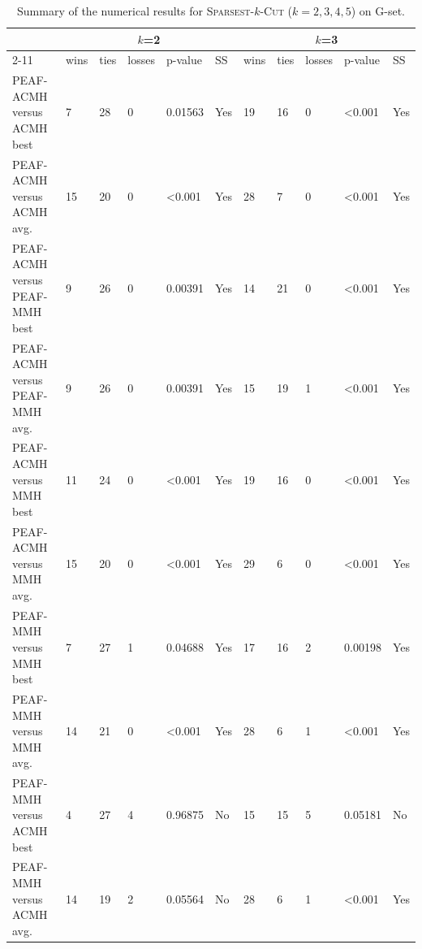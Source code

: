 \documentclass[12pt, a4paper]{article}%
\renewcommand{\arraystretch}{1.3}
\numberwithin{equation}{section}
\theoremstyle{plain}
\begin{document}
			{
				\scriptsize
				\setlength{\tabcolsep}{10pt}
				\renewcommand{\arraystretch}{1.6}
				\begin{landscape}
					\begin{longtable}{|l|lllll|lllll|}
						\caption[Summary for \textsc{Sparsest}-$k$-\textsc{Cut}]{Summary of the numerical results for \textsc{Sparsest}-$k$-\textsc{Cut} ($k=2,3,4,5$) on G-set.}
						\label{tab::sparsest-summary}\\
						\hline
						\multicolumn{1}{|c|}{\multirow{2}{*}{}} & \multicolumn{5}{c|}{$k$=2}                    & \multicolumn{5}{c|}{$k$=3}                    \\ \cline{2-11} 
						\multicolumn{1}{|c|}{}                  & wins & ties & losses & p-value          & SS  & wins & ties & losses & p-value          & SS  \\ \hline
						PEAF-ACMH versus ACMH best             & 7    & 28   & 0      & 0.01563          & Yes & 19   & 16   & 0      & \textless{}0.001 & Yes \\
						PEAF-ACMH versus ACMH avg.             & 15   & 20   & 0      & \textless{}0.001 & Yes & 28   & 7    & 0      & \textless{}0.001 & Yes \\
						PEAF-ACMH versus PEAF-MMH best           & 9    & 26   & 0      & 0.00391          & Yes & 14   & 21   & 0      & \textless{}0.001 & Yes \\
						PEAF-ACMH versus PEAF-MMH avg.           & 9    & 26   & 0      & 0.00391          & Yes & 15   & 19   & 1      & \textless{}0.001 & Yes \\
						PEAF-ACMH versus MMH best               & 11   & 24   & 0      & \textless{}0.001 & Yes & 19   & 16   & 0      & \textless{}0.001 & Yes \\
						PEAF-ACMH versus MMH avg.               & 15   & 20   & 0      & \textless{}0.001 & Yes & 29   & 6    & 0      & \textless{}0.001 & Yes \\
						PEAF-MMH versus MMH best                 & 7    & 27   & 1      & 0.04688          & Yes & 17   & 16   & 2      & 0.00198          & Yes \\
						PEAF-MMH versus MMH avg.                 & 14   & 21   & 0      & \textless{}0.001 & Yes & 28   & 6    & 1      & \textless{}0.001 & Yes \\
						PEAF-MMH versus ACMH best               & 4    & 27   & 4      & 0.96875          & No  & 15   & 15   & 5      & 0.05181          & No  \\
						PEAF-MMH versus ACMH avg.               & 14   & 19   & 2      & 0.05564          & No  & 28   & 6    & 1      & \textless{}0.001 & Yes \\

\end{longtable}
\end{landscape}}
\end{document}
